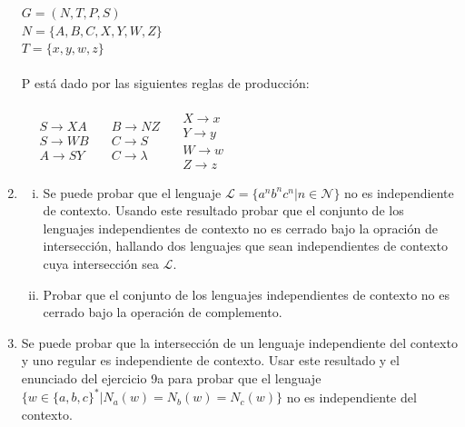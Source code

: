 \documentclass{article}
\begin{document}
\begin{enumerate}[1.]
    $G = (N,T,P,S)$ \\
    $N = \{ A,B,C,X,Y,W,Z \}$ \\
    $T = \{ x,y,w,z \}$ \\ \\
    P está dado por las siguientes reglas de producción: \\ \\
    $\quad \begin{array}{lcl}
      S \rightarrow XA\\
      S \rightarrow WB \\
      A \rightarrow SY
     \end{array} \quad
    \begin{array}{lcl}
      B \rightarrow NZ \\
      C \rightarrow S \\
      C \rightarrow \lambda
    \end{array} \quad
    \begin{array}{lcl}
      X \rightarrow x \\
      Y \rightarrow y \\
      W \rightarrow w \\
      Z \rightarrow z
    \end{array}$
  \item
    \begin{enumerate}[i.]
      \item
        Se puede probar que el lenguaje $\mathcal{L} = \{ a^n b^n c^n | n \in \mathcal{N} \}$ no es independiente
        de contexto. Usando este resultado probar que el conjunto de los lenguajes independientes de contexto no 
        es cerrado bajo la opración de intersección, hallando dos lenguajes que sean independientes de contexto
        cuya intersección sea $\mathcal{L}$.
      \item
        Probar que el conjunto de los lenguajes independientes de contexto no es cerrado bajo la operación de complemento.
    \end{enumerate}
  \item
    Se puede probar que la intersección de un lenguaje independiente del contexto y uno regular es independiente de contexto.
    Usar este resultado y el enunciado del ejercicio 9a para probar que el lenguaje $\{ w\in \{a,b,c \}^* | N_a(w) = 
    N_b(w) = N_c(w) \}$ no es independiente del contexto. 
\end{enumerate}
\end{document}
